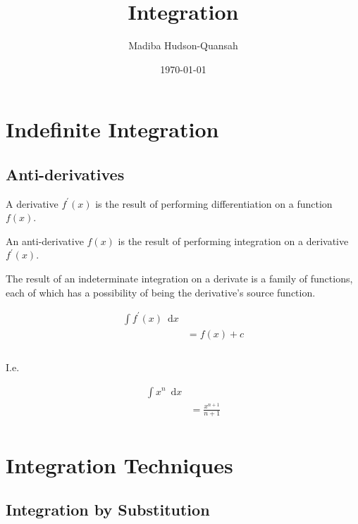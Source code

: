 \documentclass[12pt letter]{report}
\title{\Huge{Integration}}
\author{\huge{Madiba Hudson-Quansah}}
\date{\today}
\begin{document}
\maketitle
\newpage
{}
\tableofcontents
\pagebreak

\chapter{Indefinite Integration}

\section{Anti-derivatives}

A derivative $f^{\prime}(x)$ is the result of performing differentiation on a function $f(x)$.

An anti-derivative $f(x)$ is the result of performing integration on a derivative $f^{\prime}(x)$.

The result of an indeterminate integration on a derivate is a family of functions, each of which has a possibility of
being the derivative's source function.

\begin{align*}
	\int f^{\prime}(x) \enspace  \mathrm{d}x \\
	 & = f(x) + c                            \\
	\\
\end{align*}

I.e.

\begin{align*}
	\int x^{n} \enspace  \mathrm{d}x \\
	 & = \frac{x^{n+1}}{n+1}         \\
\end{align*}

\pagebreak

\chapter{Integration Techniques}

\section{Integration by Substitution}

\qs{}{
	\[
		\int x^2 \sqrt{x^3 + 5} \enspace  \mathrm{d}x \text{using } u = x^3 + 5
	\]
}
\end{document}
